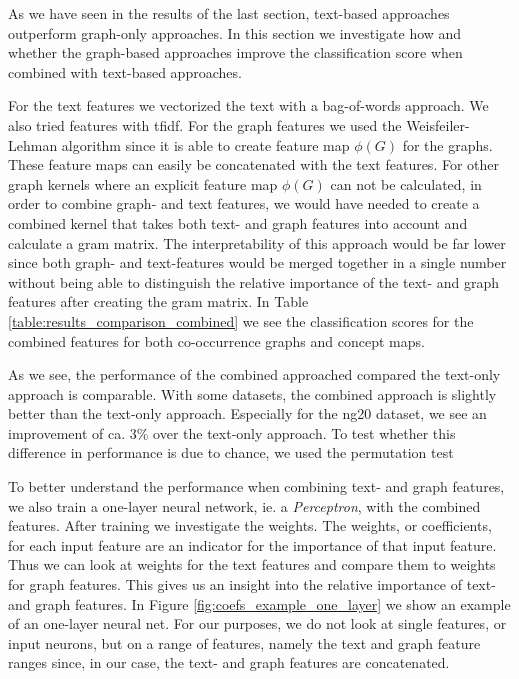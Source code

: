 
As we have seen in the results of the last section, text-based approaches outperform graph-only approaches.
In this section we investigate how and whether the graph-based approaches improve the classification score when combined with text-based approaches.

For the text features we vectorized the text with a bag-of-words approach. We also tried features with tfidf.
For the graph features we used the Weisfeiler-Lehman algorithm since it is able to create feature map $\phi(G)$ for the graphs.
These feature maps can easily be concatenated with the text features.
For other graph kernels where an explicit feature map $\phi(G)$ can not be calculated, in order to combine graph- and text features, we would have needed to create a combined kernel that takes both text- and graph features into account and calculate a gram matrix.
The interpretability of this approach would be far lower since both graph- and text-features would be merged together in a single number without being able to distinguish the relative importance of the text- and graph features after creating the gram matrix.
In Table \ref{table:results_comparison_combined} we see the classification scores for the combined features for both co-occurrence graphs and concept maps.

As we see, the performance of the combined approached compared the text-only approach is comparable.
With some datasets, the combined approach is slightly better than the text-only approach. Especially for the ng20 dataset, we see an improvement of ca. 3\% over the text-only approach.
To test whether this difference in performance is due to chance, we used the permutation test

To better understand the performance when combining text- and graph features, we also train a one-layer neural network, ie. a \textit{Perceptron}, with the combined features. After training we investigate the weights.
The weights, or coefficients, for each input feature are an indicator for the importance of that input feature.
Thus we can look at weights for the text features and compare them to weights for graph features.
This gives us an insight into the relative importance of text- and graph features.
In Figure \ref{fig:coefs_example_one_layer} we show an example of an one-layer neural net.
For our purposes, we do not look at single features, or input neurons, but on a range of features, namely the text and graph feature ranges since, in our case, the text- and graph features are concatenated.

